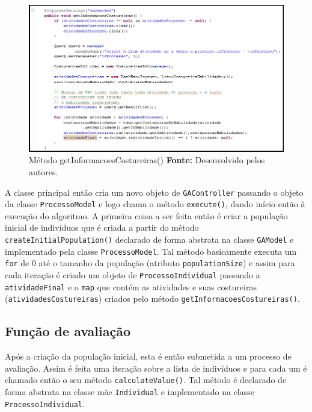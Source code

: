 \begin{figure}[h!]
	\centerline{\includegraphics[scale=0.7]{./imagens/metodo_informacoes_costureiras.png}}
	\caption[Método getInformacoesCostureiras()]
	{Método getInformacoesCostureiras() \textbf{Fonte:} Desenvolvido pelos
	autores.}
	\label{fig:exemplo1}
\end{figure}



\par A classe principal então cria um novo objeto de \texttt{GAController} passando o objeto da classe \texttt{ProcessoModel} e
logo chama o método \texttt{execute()}, dando início então à execução do
algoritmo. A primeira coisa a ser feita então é criar a população inicial de indivíduos que é criada a 
partir do método \texttt{createInitialPopulation()} declarado de forma 
abstrata na classe \texttt{GAModel} e implementado pela classe \texttt{ProcessoModel}. Tal método basicamente executa um 
\texttt{for} de 0 até o tamanho da população (atributo \texttt{populationSize})
e assim para cada iteração é criado um objeto de \texttt{ProcessoIndividual} passando a \texttt{atividadeFinal} e o 
\texttt{map} que contém as atividades e suas costureiras
(\texttt{atividadesCostureiras}) criados pelo método \texttt{getInformacoesCostureiras()}.



\subsection{Função de avaliação}

\par Após a criação da população inicial, esta é então submetida a um processo
de avaliação. Assim é feita uma iteração sobre a lista de indivíduos e para cada um é chamado então o seu método 
\texttt{calculateValue()}. Tal método é declarado de forma abstrata na classe mãe
\texttt{Individual} e implementado na classe \texttt{ProcessoIndividual}.

